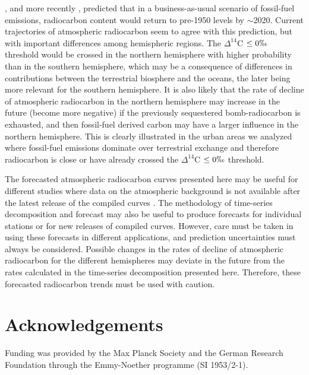 \documentclass[a4paper, 11pt]{article}
\begin{document}
\citet{Caldeira1998GRL}, and more recently \citet{Graven2015PNAS}, predicted that in a business-as-usual scenario of fossil-fuel emissions, radiocarbon content would return to pre-1950 levels by $\sim$2020. Current trajectories of atmospheric radiocarbon seem to agree with this prediction, but with important differences among hemispheric regions. The $\Delta^{14}$C $\leq 0 \permil$ threshold would be crossed in the northern hemisphere with higher probability than in the southern hemisphere, which may be a consequence of differences in contributions between the terrestrial biosphere and the oceans, the later being more relevant for the southern hemisphere. 
It is also likely that the rate of decline of atmospheric radiocarbon in the northern hemisphere may increase in the future (become more negative) if the previously sequestered bomb-radiocarbon is exhausted, and then fossil-fuel derived carbon may have a larger influence in the northern hemisphere. This is clearly illustrated in the urban areas we analyzed where fossil-fuel emissions dominate over terrestrial exchange  and therefore radiocarbon is close or have already crossed the $\Delta^{14}$C $\leq 0 \permil$ threshold. 

The forecasted atmospheric radiocarbon curves presented here may be useful for different studies where data on the atmospheric background is not available after the latest release of the compiled curves \citep{Hua2013Radiocarbon}. The methodology of time-series decomposition and forecast may also be useful to produce forecasts for individual stations or for new releases of compiled curves. However, care must be taken in using these forecasts in different applications, and prediction uncertainties must always be considered.
Possible changes in the rates of decline of atmospheric radiocarbon for the different hemispheres may deviate in the future from the rates calculated in the time-series decomposition presented here. Therefore, these forecasted radiocarbon trends must be used with caution.


\section*{Acknowledgements}
Funding was provided by the Max Planck Society and the German Research Foundation through the Emmy-Noether programme (SI 1953/2-1).

\newpage
\end{document}
